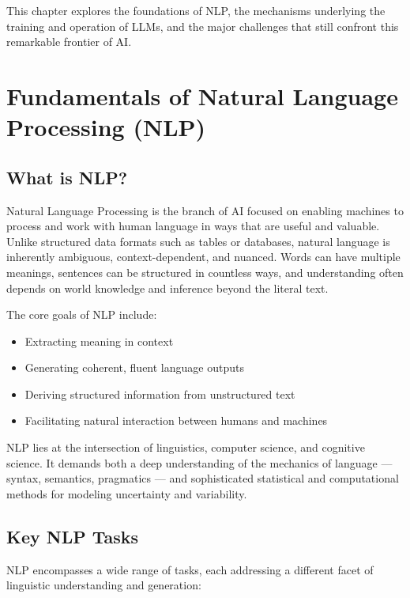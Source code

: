 \documentclass[openany]{book}
\begin{document}
This chapter explores the foundations of NLP, the mechanisms underlying the 
training and operation of LLMs, and the major challenges that still confront 
this remarkable frontier of AI.

\section{Fundamentals of Natural Language Processing (NLP)}

\subsection{What is NLP?}
Natural Language Processing is the branch of AI focused on enabling machines to 
process and work with human language in ways that are useful and valuable. 
Unlike structured data formats such as tables or databases, natural language is 
inherently ambiguous, context-dependent, and nuanced. Words can have multiple 
meanings, sentences can be structured in countless ways, and understanding often 
depends on world knowledge and inference beyond the literal text.

The core goals of NLP include:
\begin{itemize}
    \item Extracting meaning in context
    \item Generating coherent, fluent language outputs
    \item Deriving structured information from unstructured text
    \item Facilitating natural interaction between humans and machines
\end{itemize}

NLP lies at the intersection of linguistics, computer science, and cognitive 
science. It demands both a deep understanding of the mechanics of language — 
syntax, semantics, pragmatics — and sophisticated statistical and computational 
methods for modeling uncertainty and variability.

\subsection{Key NLP Tasks}
NLP encompasses a wide range of tasks, each addressing a different facet of 
linguistic understanding and generation:
\end{document}
